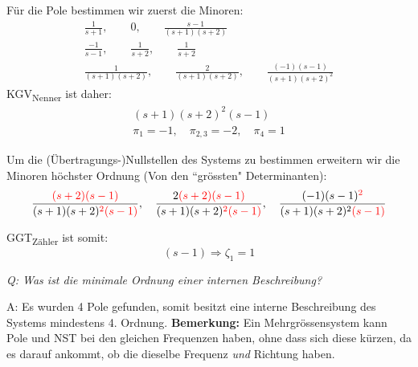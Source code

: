         Für die Pole bestimmen wir zuerst die Minoren:
        \begin{gather*}
            \frac{1}{s+1},\qquad 0,\qquad \frac{s-1}{(s+1)(s+2)}\\
            \frac{-1}{s-1},\qquad \frac{1}{s+2},\qquad \frac{1}{s+2}\\
            \frac{1}{(s+1)(s+2)},\qquad \frac{2}{(s+1)(s+2)},\qquad \frac{(-1)(s-1)}{(s+1)(s+2)^2}
        \end{gather*}
        KGV\textsubscript{Nenner} ist daher:
        \begin{gather*}
            (s+1)(s+2)^2(s-1)\\
            \pi_1 = -1,\quad \pi_{2,3} = -2,\quad \pi_4 = 1
        \end{gather*}
        
        Um die (Übertragungs-)Nullstellen des Systems zu bestimmen erweitern wir die Minoren höchster Ordnung (Von den ``grössten" Determinanten):
        \begin{equation*}
            \frac{\textcolor{red}{(s+2)(s-1)}}{(s+1)(s+2)\textcolor{red}{^2(s-1)}},\quad \frac{2\textcolor{red}{(s+2)(s-1)}}{(s+1)(s+2)\textcolor{red}{^2(s-1)}},\quad \frac{(-1)(s-1)\textcolor{red}{^2}}{(s+1)(s+2)^2\textcolor{red}{(s-1)}}
        \end{equation*}
        
        GGT\textsubscript{Zähler} ist somit:
        \begin{equation*}
            (s-1) \Rightarrow \zeta_1 = 1
        \end{equation*}
        
        \textit{Q: Was ist die minimale Ordnung einer internen Beschreibung?}
        
        A: Es wurden 4 Pole gefunden, somit besitzt eine interne Beschreibung des Systems mindestens 4. Ordnung. \textbf{Bemerkung:} Ein Mehrgrössensystem kann Pole und NST bei den gleichen Frequenzen haben, ohne dass sich diese kürzen, da es darauf ankommt, ob die dieselbe Frequenz \textit{und} Richtung haben.
        